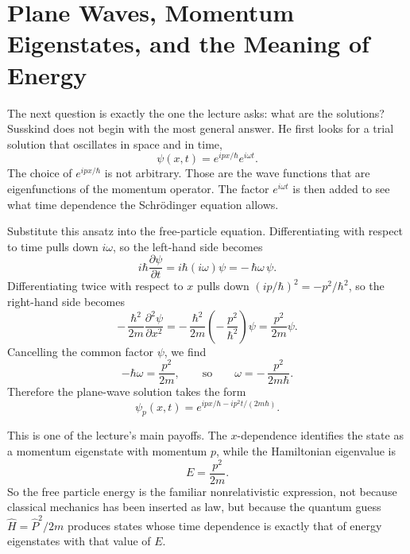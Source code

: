 \section{Plane Waves, Momentum Eigenstates, and the Meaning of Energy}

The next question is exactly the one the lecture asks: what are the solutions? Susskind does not begin with the most general answer. He first looks for a trial solution that oscillates in space and in time,
\begin{equation}
\psi(x,t) = e^{ipx/\hbar} e^{i\omega t}.
\end{equation}
The choice of \(e^{ipx/\hbar}\) is not arbitrary. Those are the wave functions that are eigenfunctions of the momentum operator. The factor \(e^{i\omega t}\) is then added to see what time dependence the Schr\"odinger equation allows.

Substitute this ansatz into the free-particle equation. Differentiating with respect to time pulls down \(i\omega\), so the left-hand side becomes
\begin{equation}
i\hbar \frac{\partial \psi}{\partial t} = i\hbar (i\omega)\psi = -\,\hbar\omega\,\psi.
\end{equation}
Differentiating twice with respect to \(x\) pulls down \((ip/\hbar)^2=-p^2/\hbar^2\), so the right-hand side becomes
\begin{equation}
-\,\frac{\hbar^2}{2m}\frac{\partial^2 \psi}{\partial x^2}
=
-\,\frac{\hbar^2}{2m}\left(-\,\frac{p^2}{\hbar^2}\right)\psi
=
\frac{p^2}{2m}\psi.
\end{equation}
Cancelling the common factor \(\psi\), we find
\begin{equation}
-\hbar\omega = \frac{p^2}{2m},
\qquad\text{so}\qquad
\omega = -\,\frac{p^2}{2m\hbar}.
\end{equation}
Therefore the plane-wave solution takes the form
\begin{equation}
\psi_p(x,t)
=
e^{ipx/\hbar - i p^2 t/(2m\hbar)}.
\end{equation}

This is one of the lecture's main payoffs. The \(x\)-dependence identifies the state as a momentum eigenstate with momentum \(p\), while the Hamiltonian eigenvalue is
\begin{equation}
E = \frac{p^2}{2m}.
\end{equation}
So the free particle energy is the familiar nonrelativistic expression, not because classical mechanics has been inserted as law, but because the quantum guess \(\hat H=\hat P^2/2m\) produces states whose time dependence is exactly that of energy eigenstates with that value of \(E\).

